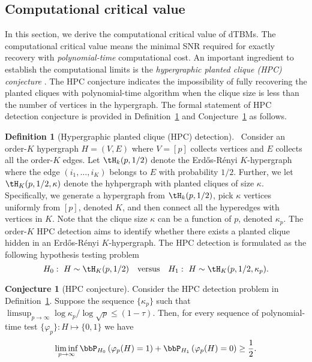 \documentclass[lettersize,onecolumn,journal]{IEEEtran}
\theoremstyle{definition}
\theoremstyle{definition}
\newtheorem{defn}{Definition}
\newtheorem{conjecture}{Conjecture}
\newcommand{\of}[1]{\left(#1\right)}
\begin{document}
\subsection{Computational critical value}\label{sec:complimit}
In this section, we derive the computational critical value of dTBMs. The computational critical value means the minimal SNR required for exactly recovery with \emph{polynomial-time} computational cost. An important ingredient to establish the computational limits is the \emph{hypergraphic planted clique (HPC) conjecture} \citep{zhang2018tensor, brennan2020reducibility}. The HPC conjecture indicates the impossibility of fully recovering the planted cliques with polynomial-time algorithm when the clique size is less than the number of vertices in the hypergraph. The formal statement of HPC detection conjecture is provided in Definition~\ref{def:HPC} and Conjecture~\ref{hypo:HPC} as follows.  


\begin{defn}[Hypergraphic planted clique (HPC) detection]~\label{def:HPC} Consider an order-$K$ hypergraph $H = (V,E)$ where $V = [p]$ collects vertices and $E$ collects all the order-$K$ edges. Let $\tH_k(p, 1/2)$ denote the Erd\H{o}s-R\'{e}nyi $K$-hypergraph where the edge $(i_1,\ldots, i_K)$ belongs to $E$ with probability $1/2$. Further, we let $\tH_K(p, 1/2, \kappa)$ denote the hyhpergraph with planted cliques of size $\kappa$. Specifically, we generate a hypergraph from $\tH_k(p, 1/2)$, pick $\kappa$ vertices uniformly from $[p]$, denoted $K$, and then connect all the hyperedges with vertices in $K$. Note that the clique size $\kappa$ can be a function of $p$, denoted $\kappa_p$. The order-$K$ HPC detection aims to identify whether there exists a planted clique hidden in an Erd\H{o}s-R\'{e}nyi $K$-hypergraph. The HPC detection is formulated as the following hypothesis testing problem
\begin{equation}
    H_0:\ H \sim \tH_K(p,1/2) \quad \text{versus} \quad H_1: \ H \sim \tH_K(p,1/2, \kappa_p).
\end{equation}
\end{defn}

\begin{conjecture}[HPC conjecture]\label{hypo:HPC} Consider the HPC detection problem in Definition~\ref{def:HPC}. Suppose the sequence $\{\kappa_p\}$ such that $\limsup_{p \rightarrow \infty} \log \kappa_p/ \log \sqrt{p} \leq (1 - \tau)$. Then, for every sequence of polynomial-time test $\{ \varphi_p\}: H \mapsto \{0,1\}$ we have 
\begin{equation}
    \liminf_{p \rightarrow \infty} \bbP_{H_0} \of{ \varphi_p(H) =1 } +  \bbP_{H_1} \of{ \varphi_p(H) =0} \geq \frac{1}{2}.
\end{equation}
\end{conjecture}
\end{document}
